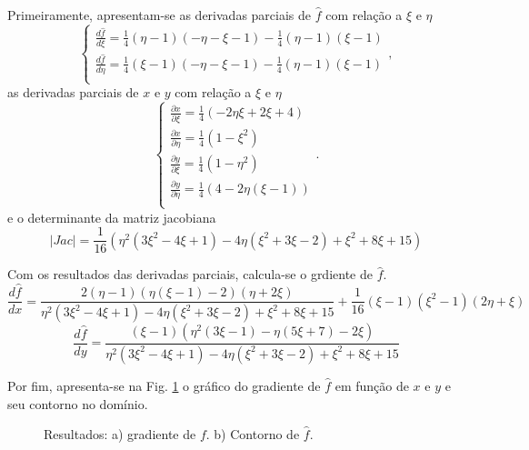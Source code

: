 Primeiramente, apresentam-se as derivadas parciais de $\hat f$ com rela\c{c}\~ao a $\xi$ e $\eta$
\begin{equation*}
    \begin{cases}
        \frac{d\hat f}{d\xi} = \frac{1}{4} (\eta -1) (-\eta -\xi -1)-\frac{1}{4} (\eta -1) (\xi -1) \\
        \frac{d\hat f}{d\eta} = \frac{1}{4} (\xi -1) (-\eta -\xi -1)-\frac{1}{4} (\eta -1) (\xi -1)  \\
    \end{cases},
\end{equation*}
as derivadas parciais de $x$ e $y$ com rela\c{c}\~ao a $\xi$ e $\eta$
\begin{equation*}
    \begin{cases}
        \frac{\partial x}{\partial \xi} = \frac{1}{4} (-2 \eta  \xi +2 \xi + 4) \\
        \frac{\partial x}{\partial \eta} = \frac{1}{4} \left(1-\xi ^2\right) \\
        \frac{\partial y}{\partial \xi} = \frac{1}{4} \left(1-\eta ^2\right) \\
        \frac{\partial y}{\partial \eta} = \frac{1}{4} (4-2 \eta  (\xi -1)) \\
    \end{cases}.
\end{equation*}
e o determinante da matriz jacobiana
\begin{equation*}
    |Jac| = \frac{1}{16} \left(\eta ^2 \left(3 \xi ^2-4 \xi +1\right)-4 \eta  \left(\xi ^2+3 \xi -2\right)+\xi ^2+8
    \xi +15\right)
\end{equation*}

Com os resultados das derivadas parciais, calcula-se o grdiente de $\hat f$. 
\begin{equation*}
    \frac{d\hat f}{dx} = \frac{2 (\eta -1) (\eta  (\xi -1)-2) (\eta +2 \xi )}{\eta ^2 \left(3 \xi ^2-4 \xi +1\right)-4 \eta 
    \left(\xi ^2+3 \xi -2\right)+\xi ^2+8 \xi +15}+\frac{1}{16} (\xi -1) \left(\xi ^2-1\right) (2 \eta
    +\xi )
\end{equation*}
\begin{equation*}
    \frac{d\hat f}{dy} = \frac{(\xi -1) \left(\eta ^2 (3 \xi -1)-\eta  (5 \xi +7)-2 \xi \right)}{\eta ^2 \left(3 \xi ^2-4 \xi
    +1\right)-4 \eta  \left(\xi ^2+3 \xi -2\right)+\xi ^2+8 \xi +15}
\end{equation*}

Por fim, apresenta-se na Fig. \ref{fig:grad4} o gr\'afico do gradiente de $\hat f$ em fun\c{c}\~ao de $x$ e $y$ e seu contorno no domínio.
\begin{figure}[H]
    \centering
    \hfill
    \caption{Resultados: a) gradiente de $f$. b) Contorno de $\hat f$.}
    \label{fig:grad4}
\end{figure}